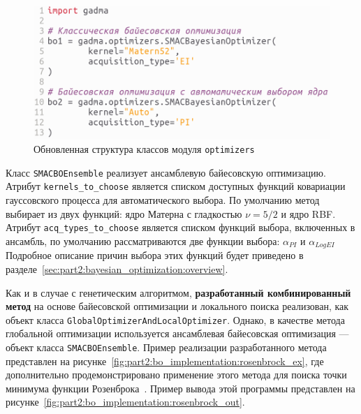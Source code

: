 \begin{figure}[ht]
    \centering
    \includegraphics[width=0.8\linewidth]{images/part2/bayesian_optimization/bo_implementation.png}
    \caption{Обновленная структура классов модуля \texttt{optimizers}}
    \label{fig:part2:bayesian_optimization:implementation:bo}
\end{figure}

Класс \texttt{SMACBOEnsemble} реализует ансамблевую байесовскую оптимизацию.
Атрибут \texttt{kernels\_to\_choose} является списком доступных функций ковариации гауссовского процесса для автоматического выбора.
По умолчанию метод выбирает из двух функций: ядро Матерна с гладкостью $\nu=5/2$ и ядро RBF.
Атрибут \texttt{acq\_types\_to\_choose} является списком функций выбора, включенных в ансамбль, по умолчанию рассматриваются две функции выбора: $\alpha_{PI}$ и $\alpha_{LogEI}$
Подробное описание причин выбора этих функций будет приведено в разделе~\ref{sec:part2:bayesian_optimization:overview}.

Как и в случае с генетическим алгоритмом, \textbf{разработанный комбинированный метод} на основе байесовской оптимизации и локального поиска реализован, как объект класса \texttt{GlobalOptimizerAndLocalOptimizer}.
Однако, в качестве метода глобальной оптимизации используется ансамблевая байесовская оптимизация --- объект класса \texttt{SMACBOEnsemble}.
Пример реализации разработанного метода представлен на рисунке~\ref{fig:part2:bo_implementation:rosenbrock_ex}, где дополнительно продемонстрировано применение этого метода для поиска точки минимума функции Розенброка~\cite{rosenbrock1960automatic}.
Пример вывода этой программы представлен на рисунке~\ref{fig:part2:bo_implementation:rosenbrock_out}.

